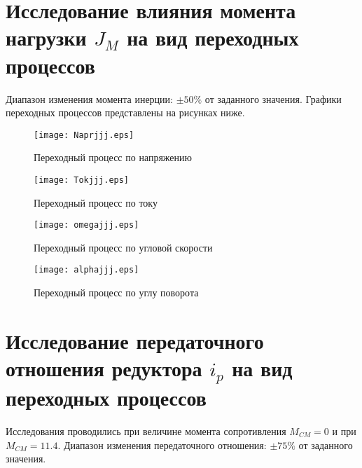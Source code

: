 \documentclass[12pt,a4paper]{article}
\begin{document}
\section{Исследование влияния момента нагрузки $J_M$ на вид переходных процессов}
Диапазон изменения момента инерции: $\pm 50\%$  от заданного значения. Графики переходных процессов представлены на рисунках ниже.
\begin{figure}[H]
	\centering
	\texttt{[image: Naprjjj.eps]}
	\caption{Переходный процесс по напряжению}
\end{figure}	
\begin{figure}[H]
	 \centering	
	\texttt{[image: Tokjjj.eps]}
	\caption{Переходный процесс по току}
\end{figure}
\begin{figure}[H]	
	 \centering
	\texttt{[image: omegajjj.eps]}
	\caption{Переходный процесс по угловой скорости}
\end{figure}
\begin{figure}[H]
	 \centering
	\texttt{[image: alphajjj.eps]}
	\caption{Переходный процесс по углу поворота}
\end{figure}

\newpage
\section{Исследование передаточного отношения редуктора $i_p$ на вид переходных процессов}
Исследования проводились при величине момента сопротивления $M_{CM}=0$ и при $M_{CM}=11.4$. Диапазон изменения передаточного отношения: $\pm 75\%$  от заданного значения.
\end{document}
